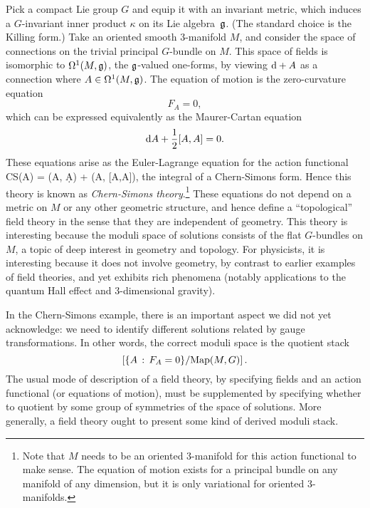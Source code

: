 \documentclass[11pt]{amsart}
\begin{document}
\begin{eg}
Pick a compact Lie group $G$ and equip it with an invariant metric,
which induces a $G$-invariant inner product $\kappa$ on its Lie algebra~$\mathfrak g$.
(The standard choice is the Killing form.)
Take an oriented smooth 3-manifold $M$, 
and consider the space of connections on the trivial principal $G$-bundle on $M$.
This space of fields is isomorphic to $\Omega^1(M, \mathfrak g)$, the $\mathfrak g$-valued one-forms, 
by viewing ${\rm d} + A$ as a connection where $A \in \Omega^1(M, \mathfrak g)$.
The equation of motion is the zero-curvature equation
\[
F_A = 0,
\]
which can be expressed equivalently as the Maurer-Cartan equation
\[
{\rm d} A + \frac{1}{2} [A,A] = 0.
\]
These equations arise as the Euler-Lagrange equation for the action functional
\beqn
\label{eqn:CS}
CS(A) =  \kappa(A, \d A) +  \kappa(A, [A,A]),
\eeqn
the integral of a Chern-Simons form.
Hence this theory is known as {\em Chern-Simons theory}.\footnote{Note that $M$ needs to be an oriented 3-manifold for this action functional to make sense.
The equation of motion exists for a principal bundle on any manifold of any dimension,
but it is only variational for oriented 3-manifolds.}
These equations do not depend on a metric on $M$ or any other geometric structure,
and hence define a ``topological'' field theory in the sense that they are independent of geometry.
This theory is interesting because the moduli space of solutions consists of the flat $G$-bundles on $M$,
a topic of deep interest in geometry and topology.
For physicists, it is interesting because it does not involve geometry, 
by contrast to earlier examples of field theories,
and yet exhibits rich phenomena (notably applications to the quantum Hall effect and 3-dimensional gravity).
\end{eg}

\begin{rmk}
In the Chern-Simons example, there is an important aspect we did not yet acknowledge:
we need to identify different solutions related by gauge transformations.
In other words, the correct moduli space is the quotient stack
\[
\left[ \{ A \,:\, F_A = 0\}/{\rm Map}(M,G) \right].
\]
The usual mode of description of a field theory, by specifying fields and an action functional (or equations of motion), 
must be supplemented by specifying whether to quotient by some group of symmetries of the space of solutions.
More generally, a field theory ought to present some kind of derived moduli stack.
\end{rmk}
\end{document}
